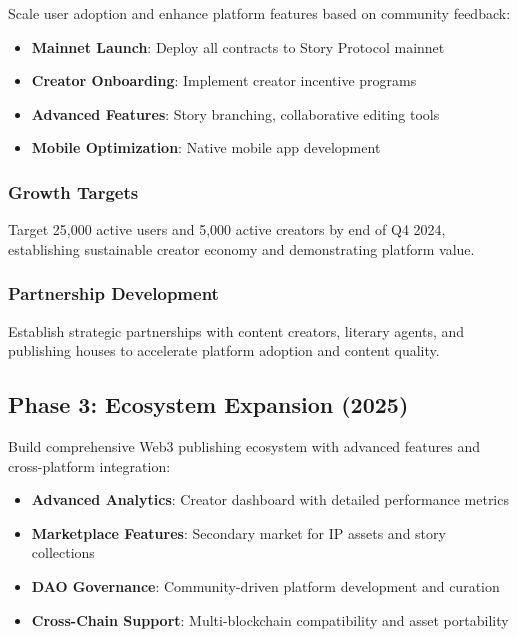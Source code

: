 Scale user adoption and enhance platform features based on community feedback:

\begin{itemize}
    \item \textbf{Mainnet Launch}: Deploy all contracts to Story Protocol mainnet
    \item \textbf{Creator Onboarding}: Implement creator incentive programs
    \item \textbf{Advanced Features}: Story branching, collaborative editing tools
    \item \textbf{Mobile Optimization}: Native mobile app development
\end{itemize}

\subsubsection{Growth Targets}

Target 25,000 active users and 5,000 active creators by end of Q4 2024, establishing sustainable creator economy and demonstrating platform value.

\subsubsection{Partnership Development}

Establish strategic partnerships with content creators, literary agents, and publishing houses to accelerate platform adoption and content quality.

\subsection{Phase 3: Ecosystem Expansion (2025)}

Build comprehensive Web3 publishing ecosystem with advanced features and cross-platform integration:

\begin{itemize}
    \item \textbf{Advanced Analytics}: Creator dashboard with detailed performance metrics
    \item \textbf{Marketplace Features}: Secondary market for IP assets and story collections
    \item \textbf{DAO Governance}: Community-driven platform development and curation
    \item \textbf{Cross-Chain Support}: Multi-blockchain compatibility and asset portability
\end{itemize}

